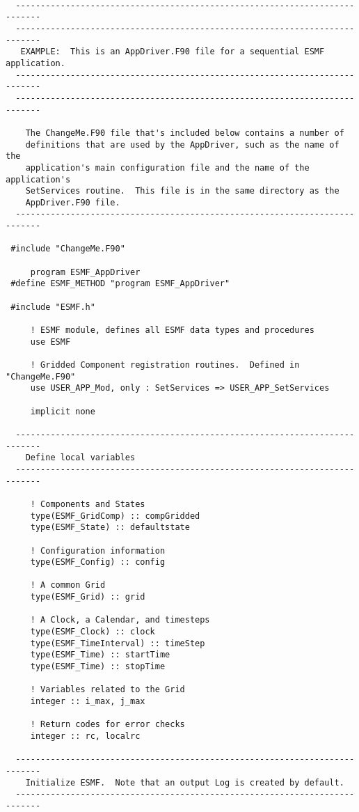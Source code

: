   \begin{verbatim}
 
  ---------------------------------------------------------------------------
  ---------------------------------------------------------------------------
   EXAMPLE:  This is an AppDriver.F90 file for a sequential ESMF application.
  ---------------------------------------------------------------------------
  ---------------------------------------------------------------------------
  
    The ChangeMe.F90 file that's included below contains a number of
    definitions that are used by the AppDriver, such as the name of the
    application's main configuration file and the name of the application's
    SetServices routine.  This file is in the same directory as the
    AppDriver.F90 file.
  ---------------------------------------------------------------------------
 
 #include "ChangeMe.F90"
 
     program ESMF_AppDriver
 #define ESMF_METHOD "program ESMF_AppDriver"
 
 #include "ESMF.h"
 
     ! ESMF module, defines all ESMF data types and procedures
     use ESMF
 
     ! Gridded Component registration routines.  Defined in "ChangeMe.F90"
     use USER_APP_Mod, only : SetServices => USER_APP_SetServices
 
     implicit none
 
  ---------------------------------------------------------------------------
    Define local variables
  ---------------------------------------------------------------------------
 
     ! Components and States
     type(ESMF_GridComp) :: compGridded
     type(ESMF_State) :: defaultstate
 
     ! Configuration information
     type(ESMF_Config) :: config
 
     ! A common Grid
     type(ESMF_Grid) :: grid
 
     ! A Clock, a Calendar, and timesteps
     type(ESMF_Clock) :: clock
     type(ESMF_TimeInterval) :: timeStep
     type(ESMF_Time) :: startTime
     type(ESMF_Time) :: stopTime
 
     ! Variables related to the Grid
     integer :: i_max, j_max
 
     ! Return codes for error checks
     integer :: rc, localrc
 
  ---------------------------------------------------------------------------
    Initialize ESMF.  Note that an output Log is created by default.
  ---------------------------------------------------------------------------
 

\end{verbatim}
